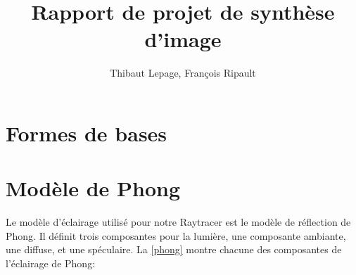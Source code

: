 \documentclass{article}
\title{Rapport de projet de synthèse d'image}
\author{Thibaut Lepage, François Ripault}
\begin{document}
\maketitle

\section{Formes de bases}

\section{Modèle de Phong}

Le modèle d'éclairage utilisé pour notre Raytracer est le modèle de réflection
de Phong. Il définit trois composantes pour la lumière, une composante
ambiante, une diffuse, et une spéculaire.
La \cref{phong} montre chacune des composantes de l'éclairage de Phong:
\end{document}
